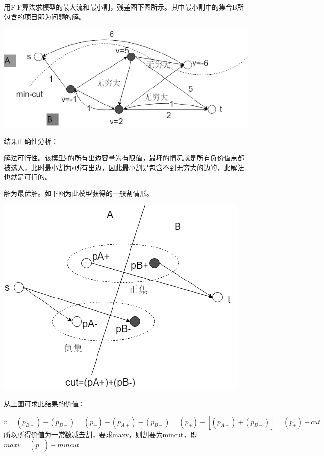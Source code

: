 用F-F算法求模型的最大流和最小割，残差图下图所示。其中最小割中的集合B所包含的项目即为问题的解。

\centerline{\includegraphics[scale=0.6]{Ln11.image/networkflow10.png}}

结果正确性分析：

解法可行性。该模型s的所有出边容量为有限值，最坏的情况就是所有负价值点都被选入，此时最小割为s所有出边，因此最小割是包含不到无穷大的边的，此解法也就是可行的。

解为最优解。如下图为此模型获得的一般割情形。

\centerline{\includegraphics[scale=0.6]{Ln11.image/networkflow11.png}}

从上图可求此结果的价值：

\begin{equation}
v = (p_{B+}) - (p_{B-}) = (p_+) - (p_{A+}) - (p_{B-}) = (p_+) - [(p_{A+}) + (p_{B-})] = (p_+) - cut
\end{equation}
所以所得价值为一常数减去割，要求maxv，则割要为mincut，即\(maxv = (p_+) -mincut\)

